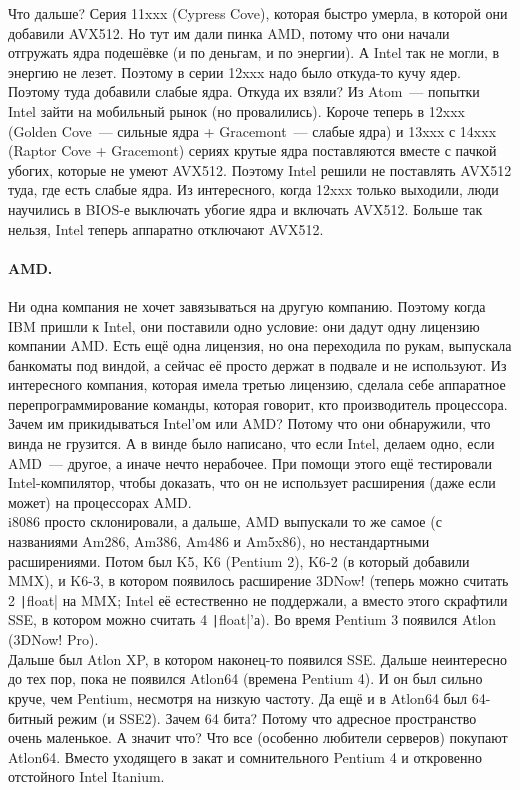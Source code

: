 \documentclass{article}
\begin{document}
    Что дальше? Серия 11xxx (Cypress Cove), которая быстро умерла, в которой они добавили AVX512. Но тут им дали пинка AMD, потому что они начали отгружать ядра подешёвке (и по деньгам, и по энергии). А Intel так не могли, в энергию не лезет. Поэтому в серии 12xxx надо было откуда-то кучу ядер. Поэтому туда добавили слабые ядра. Откуда их взяли? Из Atom~--- попытки Intel зайти на мобильный рынок (но провалились). Короче теперь в 12xxx (Golden Cove~--- сильные ядра + Gracemont~--- слабые ядра) и 13xxx с 14xxx (Raptor Cove + Gracemont) сериях крутые ядра поставляются вместе с пачкой убогих, которые не умеют AVX512. Поэтому Intel решили не поставлять AVX512 туда, где есть слабые ядра. Из интересного, когда 12xxx только выходили, люди научились в BIOS-е выключать убогие ядра и включать AVX512. Больше так нельзя, Intel теперь аппаратно отключают AVX512.
    \paragraph{AMD.}
    Ни одна компания не хочет завязываться на другую компанию. Поэтому когда IBM пришли к Intel, они поставили одно условие: они дадут одну лицензию компании AMD. Есть ещё одна лицензия, но она переходила по рукам, выпускала банкоматы под виндой, а сейчас её просто держат в подвале и не используют. Из интересного компания, которая имела третью лицензию, сделала себе аппаратное перепрограммирование команды, которая говорит, кто производитель процессора. Зачем им прикидываться Intel'ом или AMD? Потому что они обнаружили, что винда не грузится. А в винде было написано, что если Intel, делаем одно, если AMD~--- другое, а иначе нечто нерабочее. При помощи этого ещё тестировали Intel-компилятор, чтобы доказать, что он не использует расширения (даже если может) на процессорах AMD.\\
    i8086 просто склонировали, а дальше, AMD выпускали то же самое (с названиями Am286, Am386, Am486 и Am5x86), но нестандартными расширениями. Потом был K5, K6 (Pentium 2), K6-2 (в который добавили MMX), и K6-3, в котором появилось расширение 3DNow! (теперь можно считать 2 \texttt|float| на MMX; Intel её естественно не поддержали, а вместо этого скрафтили SSE, в котором можно считать 4 \texttt|float|'а). Во время Pentium 3 появился Atlon (3DNow! Pro).\\
    Дальше был Atlon XP, в котором наконец-то появился SSE. Дальше неинтересно до тех пор, пока не появился Atlon64 (времена Pentium 4). И он был сильно круче, чем Pentium, несмотря на низкую частоту. Да ещё и в Atlon64 был 64-битный режим (и SSE2). Зачем 64 бита? Потому что адресное пространство очень маленькое. А значит что? Что все (особенно любители серверов) покупают Atlon64. Вместо уходящего в закат и сомнительного Pentium 4 и откровенно отстойного Intel Itanium.\\
\end{document}
